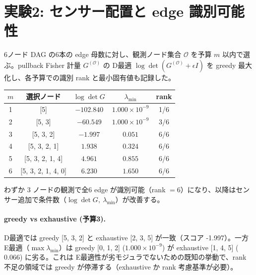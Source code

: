 \documentclass[a4paper,11pt]{ltjsarticle}
\newcommand{\OO}{\mathcal{O}}
\begin{document}
\section{実験2: センサー配置と edge 識別可能性}
6ノード DAG の6本の edge 母数に対し、観測ノード集合 $\OO$ を予算 $m$ 以内で選ぶ。pullback Fisher 計量 $G^{(\OO)}$ の D最適 $\log\det(G^{(\OO)}+\epsilon I)$ を greedy 最大化し、各予算での識別 rank と最小固有値も記録した。
\begin{center}\end{center}
\begin{center}\begin{tabular}{ccccc}\toprule
$m$ & 選択ノード & $\log\det G$ & $\lambda_{\min}$ & rank \\ \midrule
1 & [5] & $-102.840$ & $1.000\times 10^{-9}$ & 1/6 \\
2 & [5, 3] & $-60.549$ & $1.000\times 10^{-9}$ & 3/6 \\
3 & [5, 3, 2] & $-1.997$ & $0.051$ & 6/6 \\
4 & [5, 3, 2, 1] & $1.938$ & $0.324$ & 6/6 \\
5 & [5, 3, 2, 1, 4] & $4.961$ & $0.855$ & 6/6 \\
6 & [5, 3, 2, 1, 4, 0] & $6.230$ & $1.650$ & 6/6 \\
\bottomrule\end{tabular}\end{center}
わずか 3 ノードの観測で全6 edge が識別可能（rank $=6$）になり、以降はセンサー追加で条件数（$\log\det G,\ \lambda_{\min}$）が改善する。
\paragraph{greedy vs exhaustive (予算3).}D最適では greedy [5, 3, 2] と exhaustive [2, 3, 5] が一致（スコア -1.997）。一方 E最適（$\max\lambda_{\min}$）は greedy [0, 1, 2] ($1.000\times 10^{-9}$) が exhaustive [1, 4, 5] ($0.066$) に劣る。これは E最適性が劣モジュラでないための既知の挙動で、rank 不足の領域では greedy が停滞する（exhaustive か rank 考慮基準が必要）。
\end{document}
